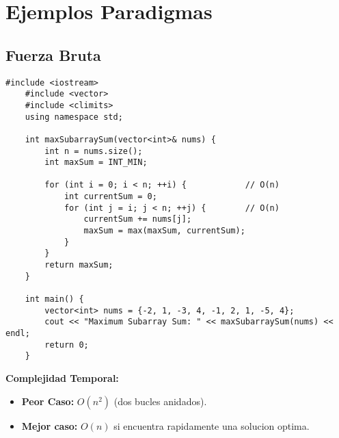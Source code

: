 \section{Ejemplos Paradigmas}

\subsection{Fuerza Bruta}
    \begin{lstlisting}[style=cpp]
    #include <iostream>
    #include <vector>
    #include <climits>
    using namespace std;
    
    int maxSubarraySum(vector<int>& nums) {
        int n = nums.size();
        int maxSum = INT_MIN;
    
        for (int i = 0; i < n; ++i) {            // O(n)
            int currentSum = 0;
            for (int j = i; j < n; ++j) {        // O(n)
                currentSum += nums[j];
                maxSum = max(maxSum, currentSum);
            }
        }
        return maxSum;
    }
    
    int main() {
        vector<int> nums = {-2, 1, -3, 4, -1, 2, 1, -5, 4};
        cout << "Maximum Subarray Sum: " << maxSubarraySum(nums) << endl;
        return 0;
    }
    \end{lstlisting}
    \textbf{Complejidad Temporal: }
    \begin{itemize}
        \item \textbf{Peor Caso: }$O(n^2)$ (dos bucles anidados).
        \item \textbf{Mejor caso: }$O(n)$ si encuentra rapidamente una solucion optima.
    \end{itemize}
\newpage

